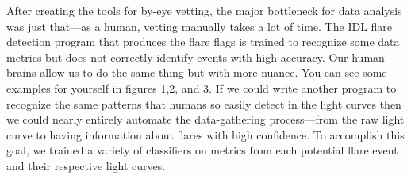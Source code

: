 \documentclass[11pt]{article}
\begin{document}
After creating the tools for by-eye vetting, the major bottleneck for
data analysis was just that---as a human, vetting manually takes a lot
of time.  The IDL flare detection program that produces the flare
flags is trained to recognize some data metrics but does not correctly
identify events with high accuracy.  Our human brains allow us to do
the same thing but with more nuance.  You can see some examples for
yourself in figures 1,2, and 3.  If we could write another
program to recognize the same patterns that humans so easily detect in
the light curves then we could nearly entirely automate the
data-gathering process---from the raw light curve to having
information about flares with high confidence.  To accomplish this
goal, we trained a variety of classifiers on metrics from each
potential flare event and their respective light curves.

\end{document}

